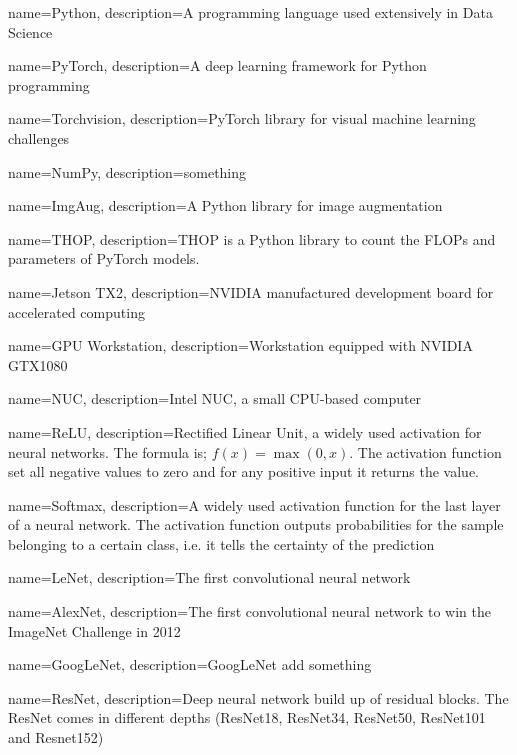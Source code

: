 {
	name=Python,
	description={A programming language used extensively in Data Science}
}

{
	name=PyTorch,
	description={A deep learning framework for Python programming}
}

{
	name={Torchvision},
	description={PyTorch library for visual machine learning challenges}
}

{
	name={NumPy},
	description={something}
}

{
	name={ImgAug},
	description={A Python library for image augmentation}
}

{
	name={THOP},
	description={THOP is a Python library to count the FLOPs and parameters of PyTorch models.}
}

{
	name=Jetson TX2,
	description={NVIDIA manufactured development board for accelerated computing}
}

{
	name={GPU Workstation},
	description={Workstation equipped with NVIDIA GTX1080}
}

{
	name={NUC},
	description={Intel NUC, a small CPU-based computer}
}


{
	name=ReLU,
	description={Rectified Linear Unit, a widely used activation for neural networks. The formula is; $f(x)=\max(0,x)$. The activation function set all negative values to zero and for any positive input it returns the value.}
}

{
	name=Softmax,
	description={A widely used activation function for the last layer of a neural network. The activation function outputs probabilities for the sample belonging to a certain class, i.e. it tells the certainty of the prediction}
}

{
	name={LeNet},
	description={The first convolutional neural network}
}

{
	name={AlexNet},
	description={The first convolutional neural network to win the ImageNet Challenge in 2012}
}

{
	name={GoogLeNet},
	description={GoogLeNet add something}
}

{
	name={ResNet},
	description={Deep neural network build up of residual blocks. The ResNet comes in different depths (ResNet18, ResNet34, ResNet50, ResNet101 and Resnet152)}
}

